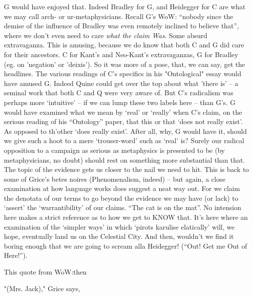 \documentclass[10pt,titlepage]{book}
\begin{document}
{G would have enjoyed that.
Indeed Bradley for G, and Heidegger for C are what we may call arch- or ur-metaphysicians.
Recall G's WoW: ``nobody since the demise of the influence of Bradley was even remotely inclined to believe that'', where we don't even need to care {\it what the claim Was}.
Some absurd extravaganza.
This is amusing, because we do know that both C and G did care for their ancestors.
C for Kant's and Neo-Kant's extravaganzas, G for Bradley (eg. on 'negation' or 'deixis').
So it was more of a pose, that, we can say, get the headlines.
The various readings of C's specifics in his "Ontological" essay would have amused G.
Indeed Quine could get over the top about what 'there is' -- a seminal work that both C and Q were very aware of.
But C's radicalism was perhaps more `intuitive' -- if we can lump these two labels here -- than G's.
G would have examined what we mean by `real' or `really' when C's claim, on the serious reading of his ``Ontology'' paper, that  this or that `does not really exist'.
As opposed to th'other `does really exist'.
After all, why, G would have it, should we give such a hoot to a mere `trouser-word' such as `real' is?
Surely our radical opposition to a campaign as serious as metaphysics is presented to be (by metaphysicians, no doubt) should rest on something more substantial than that.
The topic of the evidence gets us closer to the nail we need to hit. 
This is back to some of Grice's betes noires  (Phenomenalism, indeed) -- but again, a close examination at how language works  does suggest a neat way out. 
For we claim the denotata of our terms to go beyond  the evidence we may have (or lack) to `assert' the `warrantibility' of our  claims.
``The cat is on the mat''.
No intension here makes a strict reference as to how we get to KNOW that.
It's here where an examination of the `simpler ways' in which `pirots karulise elatically' will, we hope, eventually land us on the Celestial City.
And then, wouldn't we find it boring enough that we are going to scream alla Heidegger!
(``Out! Get me Out of Here!'').

This quote from WoW:then
 
"(Mrs. Jack)," Grice says,

}
\end{document}
